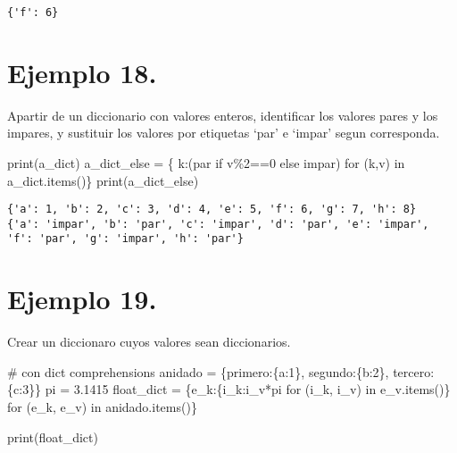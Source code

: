 \documentclass[
  letterpaper,
  DIV=11,
  numbers=noendperiod]{scrreprt}
\newenvironment{Shaded}{\begin{snugshade}}{\end{snugshade}}
\newcommand{\BuiltInTok}[1]{\textcolor[rgb]{0.00,0.23,0.31}{#1}}
\newcommand{\CommentTok}[1]{\textcolor[rgb]{0.37,0.37,0.37}{#1}}
\newcommand{\ControlFlowTok}[1]{\textcolor[rgb]{0.00,0.23,0.31}{#1}}
\newcommand{\DecValTok}[1]{\textcolor[rgb]{0.68,0.00,0.00}{#1}}
\newcommand{\FloatTok}[1]{\textcolor[rgb]{0.68,0.00,0.00}{#1}}
\newcommand{\KeywordTok}[1]{\textcolor[rgb]{0.00,0.23,0.31}{#1}}
\newcommand{\NormalTok}[1]{\textcolor[rgb]{0.00,0.23,0.31}{#1}}
\newcommand{\OperatorTok}[1]{\textcolor[rgb]{0.37,0.37,0.37}{#1}}
\newcommand{\StringTok}[1]{\textcolor[rgb]{0.13,0.47,0.30}{#1}}
\begin{document}
\begin{verbatim}
{'f': 6}
\end{verbatim}

\section{\texorpdfstring{\textbf{Ejemplo
18.}}{Ejemplo 18.}}\label{ejemplo-18.}

Apartir de un diccionario con valores enteros, identificar los valores
pares y los impares, y sustituir los valores por etiquetas `par' e
`impar' segun corresponda.

\begin{Shaded}
\begin{Highlighting}[]
\BuiltInTok{print}\NormalTok{(a\_dict)}
\NormalTok{a\_dict\_else }\OperatorTok{=}\NormalTok{ \{ k:(}\StringTok{\textquotesingle{}par\textquotesingle{}} \ControlFlowTok{if}\NormalTok{ v}\OperatorTok{\%}\DecValTok{2}\OperatorTok{==}\DecValTok{0} \ControlFlowTok{else} \StringTok{\textquotesingle{}impar\textquotesingle{}}\NormalTok{) }\ControlFlowTok{for}\NormalTok{ (k,v) }\KeywordTok{in}\NormalTok{ a\_dict.items()\}}
\BuiltInTok{print}\NormalTok{(a\_dict\_else)}
\end{Highlighting}
\end{Shaded}

\begin{verbatim}
{'a': 1, 'b': 2, 'c': 3, 'd': 4, 'e': 5, 'f': 6, 'g': 7, 'h': 8}
{'a': 'impar', 'b': 'par', 'c': 'impar', 'd': 'par', 'e': 'impar', 'f': 'par', 'g': 'impar', 'h': 'par'}
\end{verbatim}

\section{\texorpdfstring{\textbf{Ejemplo
19.}}{Ejemplo 19.}}\label{ejemplo-19.}

Crear un diccionaro cuyos valores sean diccionarios.

\begin{Shaded}
\begin{Highlighting}[]
\CommentTok{\# con dict comprehensions}
\NormalTok{anidado }\OperatorTok{=}\NormalTok{ \{}\StringTok{\textquotesingle{}primero\textquotesingle{}}\NormalTok{:\{}\StringTok{\textquotesingle{}a\textquotesingle{}}\NormalTok{:}\DecValTok{1}\NormalTok{\}, }\StringTok{\textquotesingle{}segundo\textquotesingle{}}\NormalTok{:\{}\StringTok{\textquotesingle{}b\textquotesingle{}}\NormalTok{:}\DecValTok{2}\NormalTok{\}, }\StringTok{\textquotesingle{}tercero\textquotesingle{}}\NormalTok{:\{}\StringTok{\textquotesingle{}c\textquotesingle{}}\NormalTok{:}\DecValTok{3}\NormalTok{\}\}}
\NormalTok{pi }\OperatorTok{=} \FloatTok{3.1415}
\NormalTok{float\_dict }\OperatorTok{=}\NormalTok{ \{e\_k:\{i\_k:i\_v}\OperatorTok{*}\NormalTok{pi }\ControlFlowTok{for}\NormalTok{ (i\_k, i\_v) }\KeywordTok{in}\NormalTok{ e\_v.items()\} }\ControlFlowTok{for}\NormalTok{ (e\_k, e\_v) }\KeywordTok{in}\NormalTok{ anidado.items()\}}

\BuiltInTok{print}\NormalTok{(float\_dict)}
\end{Highlighting}
\end{Shaded}
\end{document}
